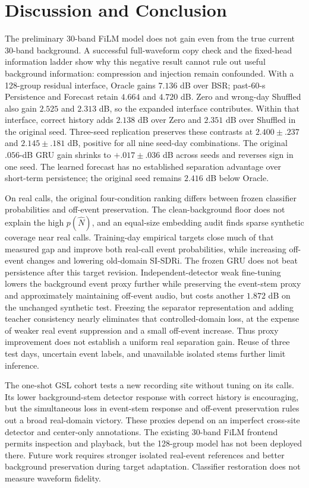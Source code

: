 \documentclass[conference]{IEEEtran}
\begin{document}
\section{Discussion and Conclusion}
The preliminary 30-band FiLM model does not gain even from the true current
30-band background. A successful full-waveform copy check and the fixed-head
information ladder show why this negative result cannot rule out useful
background information: compression and injection remain confounded.
With a 128-group residual interface, Oracle gains $7.136$ dB over BSR;
past-60-s Persistence and Forecast retain $4.664$ and $4.720$ dB. Zero and
wrong-day Shuffled also gain $2.525$ and $2.313$ dB, so the expanded interface
contributes. Within that interface, correct history adds $2.138$ dB over Zero
and $2.351$ dB over Shuffled in the original seed. Three-seed replication
preserves these contrasts at $2.400\pm.237$ and $2.145\pm.181$ dB, positive
for all nine seed-day combinations. The original $.056$-dB GRU gain shrinks
to $+.017\pm.036$ dB across seeds and reverses sign in one seed. The learned
forecast has no established separation advantage over short-term persistence;
the original seed remains $2.416$ dB below Oracle.

On real calls, the original four-condition ranking differs between frozen
classifier probabilities and off-event preservation. The clean-background
floor does not explain the high $p(\hat N)$, and an equal-size embedding audit
finds sparse synthetic coverage near real calls. Training-day empirical
targets close much of that measured gap and improve both real-call event
probabilities, while increasing off-event changes and lowering old-domain
SI-SDRi. The frozen GRU does not beat persistence after this target revision.
Independent-detector weak fine-tuning lowers the background event proxy
further while preserving the event-stem proxy and approximately maintaining
off-event audio, but costs another $1.872$ dB on the unchanged synthetic
test. Freezing the separator representation and adding teacher consistency
nearly eliminates that controlled-domain loss, at the expense of weaker real
event suppression and a small off-event increase. Thus proxy improvement
does not establish a uniform real separation gain. Reuse of three test days,
uncertain event labels, and unavailable isolated stems further limit inference.

The one-shot GSL cohort tests a new recording site without tuning on its
calls. Its lower background-stem detector response with correct history is
encouraging, but the simultaneous loss in event-stem response and off-event
preservation rules out a broad real-domain victory. These proxies depend on
an imperfect cross-site detector and center-only annotations. The existing
30-band FiLM frontend permits inspection and playback, but the 128-group
model has not been deployed there. Future work requires stronger isolated
real-event references and better background preservation during target
adaptation. Classifier restoration does not measure waveform fidelity.

\balance


\end{document}
